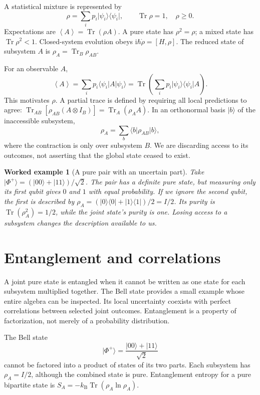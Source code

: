 \documentclass[11pt,oneside]{book}
\newcommand{\ii}{\mathrm{i}}
\newcommand{\avg}[1]{\left\langle #1\right\rangle}
\newcommand{\ket}[1]{\lvert #1\rangle}
\newcommand{\bra}[1]{\langle #1\rvert}
\newcommand{\kb}{k_{\mathrm B}}
\theoremstyle{reviewstyle}
\newtheorem{example}{Worked example}[chapter]
\begin{document}
A statistical mixture is represented by
\begin{equation}\rho=\sum_i p_i\ket{\psi_i}\bra{\psi_i},\qquad \operatorname{Tr}\rho=1,\quad \rho\geq0.\end{equation}
Expectations are $\avg A=\operatorname{Tr}(\rho A)$. A pure state has $\rho^2=\rho$; a mixed state has $\operatorname{Tr}\rho^2<1$. Closed-system evolution obeys $\ii\hbar\dot\rho=[H,\rho]$. The reduced state of subsystem $A$ is $\rho_A=\operatorname{Tr}_B\rho_{AB}$.

For an observable $A$,
\begin{equation}
\avg A=\sum_ip_i\bra{\psi_i}A\ket{\psi_i}
=\operatorname{Tr}\left(\sum_ip_i\ket{\psi_i}\bra{\psi_i}A\right).
\end{equation}
This motivates $\rho$. A partial trace is defined by requiring all local predictions to agree: $\operatorname{Tr}_{AB}[\rho_{AB}(A\otimes I_B)]=\operatorname{Tr}_A(\rho_AA)$. In an orthonormal basis $\ket b$ of the inaccessible subsystem,
\begin{equation}
\rho_A=\sum_b\bra b\rho_{AB}\ket b,
\end{equation}
where the contraction is only over subsystem $B$. We are discarding access to its outcomes, not asserting that the global state ceased to exist.

\begin{example}[A pure pair with an uncertain part]
Take $\ket{\Phi^+}=(\ket{00}+\ket{11})/\sqrt2$. The pair has a definite pure state, but measuring only its first qubit gives $0$ and $1$ with equal probability. If we ignore the second qubit, the first is described by $\rho_A=(\ket0\bra0+\ket1\bra1)/2=I/2$. Its purity is $\operatorname{Tr}(\rho_A^2)=1/2$, while the joint state's purity is one. Losing access to a subsystem changes the description available to us.
\end{example}

\section{Entanglement and correlations}
A joint pure state is entangled when it cannot be written as one state for each subsystem multiplied together. The Bell state provides a small example whose entire algebra can be inspected. Its local uncertainty coexists with perfect correlations between selected joint outcomes. Entanglement is a property of factorization, not merely of a probability distribution.

The Bell state
\begin{equation}\ket{\Phi^+}=\frac{\ket{00}+\ket{11}}{\sqrt2}\end{equation}
cannot be factored into a product of states of its two parts. Each subsystem has $\rho_A=I/2$, although the combined state is pure. Entanglement entropy for a pure bipartite state is
$S_A=-\kb\operatorname{Tr}(\rho_A\ln\rho_A)$.
\end{document}
